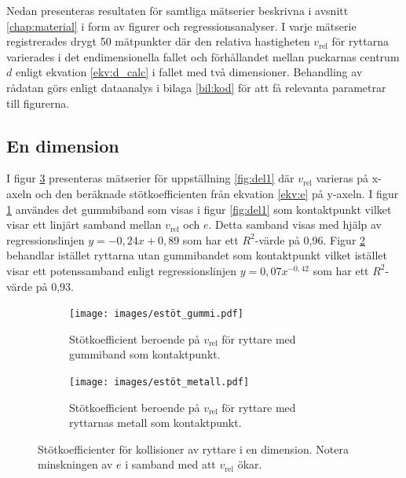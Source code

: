 Nedan presenteras resultaten för samtliga mätserier beskrivna i avsnitt \ref{chap:material} i form av figurer och regressionsanalyser. I varje mätserie registrerades drygt 50 mätpunkter där den relativa hastigheten $v_{\text{rel}}$ för ryttarna varierades i det endimensionella fallet och förhållandet mellan puckarnas centrum $d$ enligt ekvation \eqref{ekv:d_calc} i fallet med två dimensioner. Behandling av rådatan görs enligt dataanalys i bilaga \ref{bil:kod} för att få relevanta parametrar till figurerna. 

\subsection{En dimension}
I figur \ref{fig:endimstöt} presenteras mätserier för uppställning \ref{fig:del1}  där $v_{\text{rel}}$ varieras på x-axeln och den beräknade stötkoefficienten från ekvation \eqref{ekv:e} på y-axeln. I figur \ref{fig:estötgummi_bord} användes det gummbiband som visas i figur \ref{fig:del1} som kontaktpunkt vilket visar ett linjärt samband mellan $v_{\text{rel}}$ och $e$. Detta samband visas med hjälp av regressionslinjen $y = -0,24x + 0,89$ som har ett $R^2$-värde på 0,96. Figur \ref{fig:estötmetall} behandlar istället ryttarna utan gummibandet som kontaktpunkt vilket istället visar ett potenssamband enligt  regressionslinjen $y = 0,07x^{-0,42}$ som har ett $R^2$-värde på 0,93.


\begin{figure}[H]
    
    \begin{subfigure}{.5\textwidth}
        \centering
        \hspace*{-1.2cm}
        \texttt{[image: images/estöt\_gummi.pdf]} %
        \caption{Stötkoefficient beroende på $v_{\text{rel}}$ för ryttare med gummiband som kontaktpunkt.}
        \label{fig:estötgummi_bord}
    \end{subfigure} 
    \hfill
    \hspace*{0.2cm}
    \begin{subfigure}{.5\textwidth}
        \centering
        \hspace*{-1.2cm}
        \texttt{[image: images/estöt\_metall.pdf]} %
        \caption{Stötkoefficient beroende på $v_{\text{rel}}$ för ryttare med ryttarnas metall som kontaktpunkt.}
        \label{fig:estötmetall}
    \end{subfigure}
    \caption{Stötkoefficienter för kollisioner av ryttare i en dimension. Notera minskningen av $e$ i samband med att $v_{\text{rel}}$ ökar.}
    \label{fig:endimstöt}
\end{figure}

